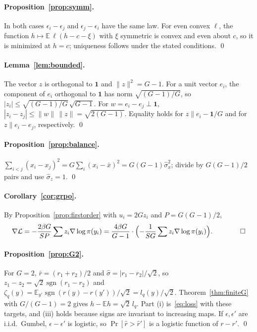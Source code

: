 \documentclass[11pt]{article}
\theoremstyle{definition}
\theoremstyle{remark}
\newcommand{\E}{\mathbb{E}}
\newcommand{\sgn}{\operatorname{sgn}}
\newcommand{\cL}{\mathcal{L}}
\newcommand{\1}{\mathbb{1}}
\begin{document}
\paragraph{Proposition~\ref{prop:symm}.} In both cases $\epsilon_i-\epsilon_j$ and
$\epsilon_j-\epsilon_i$ have the same law. For even convex $\ell$, the function
$h\mapsto\E\,\ell(h-c-\xi)$ with $\xi$ symmetric is convex and even about $c$, so it
is minimized at $h=c$; uniqueness follows under the stated conditions. \qed

\paragraph{Lemma~\ref{lem:bounded}.} The vector $z$ is orthogonal to $\mathbf{1}$ and
$\|z\|^2=G-1$. For a unit vector $e_i$, the component of $e_i$ orthogonal to $\mathbf{1}$
has norm $\sqrt{(G-1)/G}$, so $|z_i|\le\sqrt{(G-1)/G}\,\sqrt{G-1}$. For
$w=e_i-e_j\perp\mathbf{1}$, $|z_i-z_j|\le\|w\|\,\|z\|=\sqrt{2(G-1)}$. Equality holds for
$z\parallel e_i-\mathbf{1}/G$ and for $z\parallel e_i-e_j$, respectively. \qed

\paragraph{Proposition~\ref{prop:balance}.} $\sum_{i<j}(x_i-x_j)^2=G\sum_i(x_i-\bar x)^2=G(G-1)\hat\sigma_x^2$;
divide by $G(G-1)/2$ pairs and use $\hat\sigma_z=1$. \qed

\paragraph{Corollary~\ref{cor:grpo}.} By Proposition~\ref{prop:firstorder} with $u_i=2Gz_i$ and $P=G(G-1)/2$,
\[
  \nabla\cL=-\frac{2\beta G}{SP}\sum z_i\nabla\log\pi(y_i)
  =\frac{4\beta G}{G-1}\cdot\Bigl(-\frac{1}{SG}\sum z_i\nabla\log\pi(y_i)\Bigr).\qquad\qed
\]

\paragraph{Proposition~\ref{prop:G2}.} For $G=2$, $\bar r=(r_1+r_2)/2$ and
$\hat\sigma=|r_1-r_2|/\sqrt2$, so $z_1-z_2=\sqrt2\sgn(r_1-r_2)$ and
$\zeta_q(y)=\E_{y'}\sgn(r(y)-r(y'))/\sqrt2=l_q(y)/\sqrt2$. Theorem~\ref{thm:finiteG} with
$G/(G-1)=2$ gives $h-\E h=\sqrt2\,l_q$. Part (i) is~\eqref{eq:loss} with these targets,
and (iii) holds because signs are invariant to increasing maps. If
$\epsilon,\epsilon'$ are i.i.d.\ Gumbel, $\epsilon-\epsilon'$ is logistic, so
$\Pr[\hat r>\hat r']$ is a logistic function of $r-r'$. \qed
\end{document}
